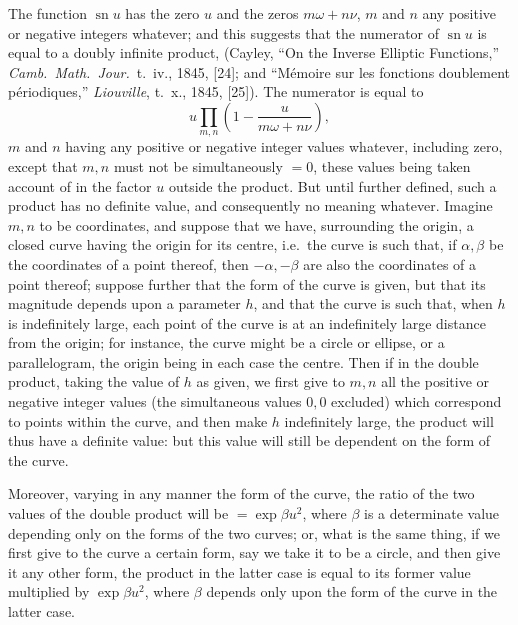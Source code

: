 \documentclass[11pt,a4paper]{article}
\DeclareMathOperator{\sn}{sn}
\begin{document}
The function $\sn u$ has the zero $u$ and the zeros $m\omega + n\nu$, $m$ and $n$ any positive or negative integers whatever; and this suggests that the numerator of $\sn u$ is equal to a doubly infinite product, (Cayley, ``On the Inverse Elliptic Functions,'' \textit{Camb.\ Math.\ Jour.}\ t.~iv., 1845, [24]; and ``M\'{e}moire sur les fonctions doublement p\'{e}riodiques,'' \textit{Liouville}, t.~x., 1845, [25]). The numerator is equal to
\[
u \prod_{m,n}\left(1 - \frac{u}{m\omega + n\nu}\right),
\]
$m$ and $n$ having any positive or negative integer values whatever, including zero, except that $m, n$ must not be simultaneously $= 0$, these values being taken account of in the factor $u$ outside the product. But until further defined, such a product has no definite value, and consequently no meaning whatever. Imagine $m, n$ to be coordinates, and suppose that we have, surrounding the origin, a closed curve having the origin for its centre, i.e.\ the curve is such that, if $\alpha, \beta$ be the coordinates of a point thereof, then $-\alpha, -\beta$ are also the coordinates of a point thereof; suppose further that the form of the curve is given, but that its magnitude depends upon a parameter $h$, and that the curve is such that, when $h$ is indefinitely large, each point of the curve is at an indefinitely large distance from the origin; for instance, the curve might be a circle or ellipse, or a parallelogram, the origin being in each case the centre. Then if in the double product, taking the value of $h$ as given, we first give to $m, n$ all the positive or negative integer values (the simultaneous values $0, 0$ excluded) which correspond to points within the curve, and then make $h$ indefinitely large, the product will thus have a definite value: but this value will still be dependent on the form of the curve.

Moreover, varying in any manner the form of the curve, the ratio of the two values of the double product will be $= \exp\beta u^{2}$, where $\beta$ is a determinate value depending only on the forms of the two curves; or, what is the same thing, if we first give to the curve a certain form, say we take it to be a circle, and then give it any other form, the product in the latter case is equal to its former value multiplied by $\exp\beta u^{2}$, where $\beta$ depends only upon the form of the curve in the latter case.
\end{document}
